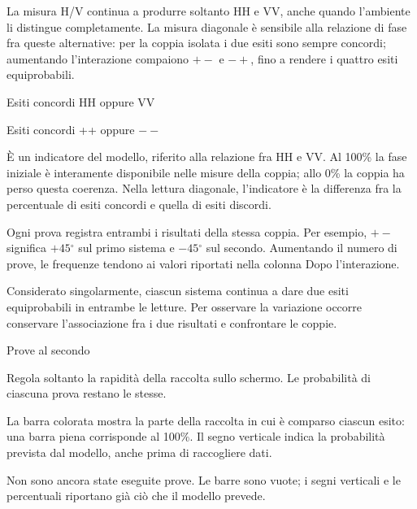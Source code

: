 La misura H/V continua a produrre soltanto HH e VV, anche quando l'ambiente li distingue completamente. La misura diagonale è sensibile alla relazione di fase fra queste alternative: per la coppia isolata i due esiti sono sempre concordi; aumentando l'interazione compaiono \(+- \) e \(- +\), fino a rendere i quattro esiti equiprobabili.\par

Esiti concordi HH oppure VV\par

Esiti concordi ++ oppure \(- - \)\par

È un indicatore del modello, riferito alla relazione fra HH e VV. Al 100\% la fase iniziale è interamente disponibile nelle misure della coppia; allo 0\% la coppia ha perso questa coerenza. Nella lettura diagonale, l'indicatore è la differenza fra la percentuale di esiti concordi e quella di esiti discordi.\par

Ogni prova registra entrambi i risultati della stessa coppia. Per esempio, \(+- \) significa \(+45{}^{\circ} \) sul primo sistema e \(- 45{}^{\circ} \) sul secondo. Aumentando il numero di prove, le frequenze tendono ai valori riportati nella colonna \guillemotleft{}Dopo l'interazione\guillemotright{}.\par

Considerato singolarmente, ciascun sistema continua a dare due esiti equiprobabili in entrambe le letture. Per osservare la variazione occorre conservare l'associazione fra i due risultati e confrontare le coppie.\par

Prove al secondo\par

Regola soltanto la rapidità della raccolta sullo schermo. Le probabilità di ciascuna prova restano le stesse.\par

La barra colorata mostra la parte della raccolta in cui è comparso ciascun esito: una barra piena corrisponde al 100\%. Il segno verticale indica la probabilità prevista dal modello, anche prima di raccogliere dati.\par

Non sono ancora state eseguite prove. Le barre sono vuote; i segni verticali e le percentuali riportano già ciò che il modello prevede.\par

